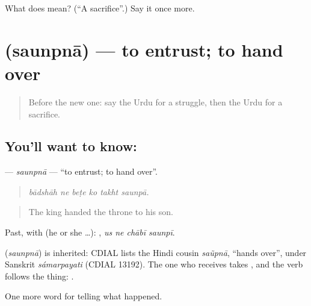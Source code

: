 \begin{tcolorbox}[breakable,colback=teal!4,colframe=teal!35!black,title={Before you move on}]
What does  mean? (\textquotedblleft{}A sacrifice\textquotedblright{}.) Say it once more.
\end{tcolorbox}
\section[\texorpdfstring{\ur{سونپنا} (saunpnā)}{سونپنا (saunpnā)}]{ (saunpnā) — to entrust; to hand over}

\label{lesson:UR-C313-saunpna}



\begin{quote}
Before the new one: say the Urdu for a struggle, then the Urdu for a sacrifice.
\end{quote}

\subsection*{You'll want to know: }
\textbf{} — \emph{saunpnā} — \textquotedblleft{}to entrust; to hand over\textquotedblright{}.

\begin{quote}
     
\end{quote}

\begin{quote}
\emph{bādshāh ne beṭe ko takht saunpā.}
\end{quote}

\begin{quote}
The king handed the throne to his son.
\end{quote}

Past, with  (he or she …):    , \emph{us ne chābī saunpī}.

\begin{cousinweb}
\textbf{} (\emph{saunpnā}) is inherited: CDIAL lists the Hindi cousin \emph{saũpnā}, \textquotedblleft{}hands over\textquotedblright{}, under Sanskrit \emph{sámarpayati} (CDIAL 13192). The one who receives takes \textbf{}, and the verb follows the thing: \textbf{ }.
\end{cousinweb}

\begin{grammarlens}[title={What you've built}]
One more word for telling what happened.
\end{grammarlens}

